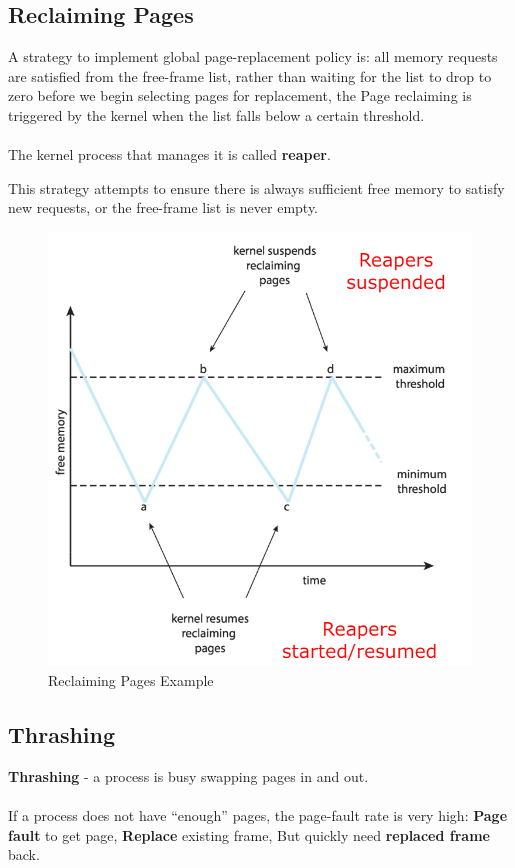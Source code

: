 \newpage
\subsection{Reclaiming Pages}
A strategy to implement global page-replacement policy is: all memory requests are satisfied from the free-frame list, rather than waiting for the list to drop to zero before we begin
selecting pages for replacement, the Page reclaiming is triggered by the kernel when the list falls below a
certain threshold.

\paragraph{}
The kernel process that manages it is called \textbf{reaper}.

This strategy attempts to ensure there is always sufficient free
memory to satisfy new requests, or the free-frame list is never empty.

\begin{figure}[htbp]
    \centering
    \includegraphics[width=0.6\linewidth]{img/andg.png}
    \caption{Reclaiming Pages Example }
\end{figure}


\newpage
\subsection{Thrashing}

\textbf{Thrashing} - a process is busy swapping pages in and out.
\paragraph{}

If a process does not have “enough” pages, the page-fault rate is very
high: \textbf{Page fault} to get page, \textbf{Replace} existing frame, But quickly need \textbf{replaced frame} back.

